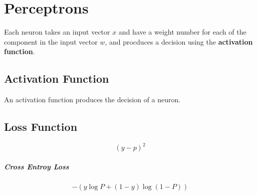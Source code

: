 \chapter{Perceptrons}

Each neuron takes an input vector $ x $ and have a weight number for
each of the component in the input vector $ w $, and procduces a
decision using the \textbf{activation function}.

\section{Activation Function}

  An activation function produces the decision of a neuron.

\section{Loss Function}

  \begin{equation}
    \left( y - p \right)^{2}
  \end{equation}

  \paragraph{Cross Entroy Loss}
  \begin{equation}
    -\left( y \log P + \left( 1 - y \right) \log\left( 1 - P \right) \right)
  \end{equation}

